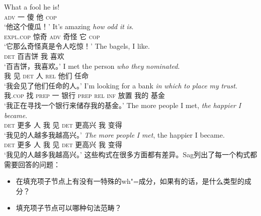\begin{exe}
\begin{xlist}[iv.]
\begin{exe}
\begin{xlist}[iv.]
\eal
\ex
\gll What a fool he is!\\
     \textsc{adv} 一 傻 他 \textsc{cop}\\
\glt `他这个傻瓜！'
\ex
\gll It's amazing \emph{how} \emph{odd} \emph{it} \emph{is}.\\
     \textsc{expl}.\textsc{cop} 惊奇 \textsc{adv} 奇怪 它 \textsc{cop}\\
\glt `它那么奇怪真是令人吃惊！' 
\zl
\ea
\gll The bagels, I like.\\
     \textsc{det} 百吉饼 我 喜欢\\
\glt `百吉饼，我喜欢。'
\z
\eal
\ex
\gll I met the person \emph{who} \emph{they} \emph{nominated}.\\
     我 见 \textsc{det} 人 \textsc{rel} 他们 任命\\
\glt `我会见了他们任命的人。' 
\ex
\gll I'm looking for a bank \emph{in} \emph{which} \emph{to} \emph{place} \emph{my} \emph{trust}.\\
     我.\textsc{cop} 找 \textsc{prep} 一 银行 \textsc{prep} \textsc{rel} \textsc{inf} 放置 我的 基金\\
\glt `我正在寻找一个银行来储存我的基金。' 
\zl
\eal
\ex
\gll The more people I met, \emph{the} \emph{happier} \emph{I} \emph{became}.\\
     \textsc{det} 更多 人 我 见 \textsc{det} 更高兴 我 变得\\
\glt `我见的人越多我越高兴。' 
\ex 
\gll \emph{The} \emph{more} \emph{people} \emph{I} \emph{met}, the happier I became.\\
     \textsc{det} 更多 人 我 见 \textsc{det} 更高兴 我 变得\\
\glt `我见的人越多我越高兴。'
\zl
这些构式在很多方面都有差异。Sag列出了每一个构式都需要回答的问题：
\begin{itemize}
\item 在填充项子节点上有没有一特殊的wh"=成分，如果有的话，是什么类型的成分？
\item 填充项子节点可以哪种句法范畴？

\end{itemize}
\end{xlist}
\end{exe}
\end{xlist}
\end{exe}
